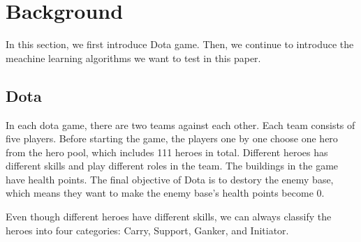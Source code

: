 \section{Background}
In this section, we first introduce Dota game.
Then, we continue to introduce the meachine learning algorithms we want to test in this paper. 

\subsection{Dota}
In each dota game, there are two teams against each other.
Each team consists of five players.
Before starting the game, the players one by one choose one hero from the hero pool, which includes 111 heroes in total.
Different heroes has different skills and play different roles in the team.
The buildings in the game have health points.
The final objective of Dota is to destory the enemy base, which means they want to make the enemy base's health points become 0. 

Even though different heroes have different skills, we can always classify the heroes into four categories: Carry, Support, Ganker, and Initiator.

